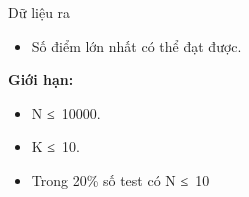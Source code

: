 Dữ liệu ra
\begin{itemize}
	\item     Số điểm lớn nhất có thể đạt được.   
\end{itemize}

\textbf{    Giới hạn:   }
\begin{itemize}
	\item     N ≤ 10000.   
	\item     K ≤ 10.   
	\item     Trong 20\% số test có N ≤ 10   
\end{itemize}